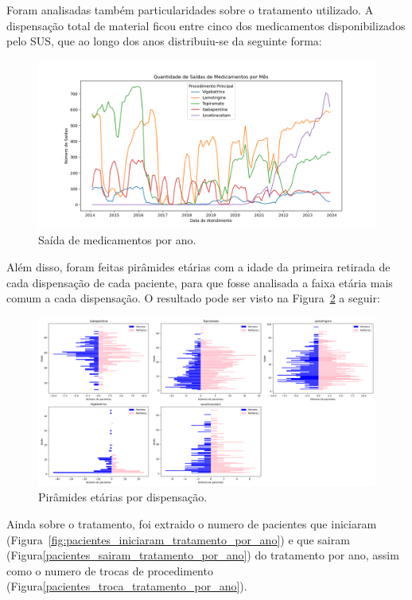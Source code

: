 \documentclass[article,a4paper,12pt,brazil,sumario=tradicional]{abntex2}
\begin{document}
Foram analisadas também particularidades sobre o tratamento utilizado. A dispensação total de material ficou entre cinco dos medicamentos disponibilizados pelo SUS, que ao longo dos anos distribuiu-se da seguinte forma:

\begin{figure}[!ht]
    \centering
    \includegraphics[width=1\textwidth]{saida_medicamentos_por_mes.png}
    \caption{Saída de medicamentos por ano.}
    \label{fig:saida_medicamentos_por_mes}
\end{figure}

Além disso, foram feitas pirâmides etárias com a idade da primeira retirada de cada dispensação de cada paciente, para que fosse analisada a faixa etária mais comum a cada dispensação. O resultado pode ser visto na Figura~\ref{fig:grid_piramides_etarias_medicamento} a seguir:

\begin{figure}[!ht]
    \centering
    \includegraphics[width=1\textwidth]{grid_piramides_etarias_medicamento.png}
    \caption{Pirâmides etárias por dispensação.}
    \label{fig:grid_piramides_etarias_medicamento}
\end{figure}

Ainda sobre o tratamento, foi extraido o numero de pacientes que iniciaram (Figura~\ref{fig:pacientes_iniciaram_tratamento_por_ano}) e que sairam (Figura\ref{pacientes_sairam_tratamento_por_ano}) do tratamento por ano, assim como o numero de trocas de procedimento (Figura\ref{pacientes_troca_tratamento_por_ano}).
\end{document}
